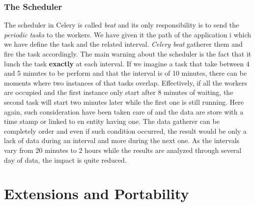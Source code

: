 \subsubsection*{The Scheduler}
The scheduler in Celery is called \emph{beat} and its only responsibility is to send the \emph{periodic tasks} to the workers. We have given it the path of the application i which we have define the task and the related interval. \emph{Celery beat} gatherer them and fire the task accordingly. The main warning about the scheduler is the fact that it lunch the task \textbf{exactly} at each interval. If we imagine a task that take between 4 and 5 minutes to be perform and that the interval is of 10 minutes, there can be moments where two instances of that tasks overlap. Effectively, if all the workers are occupied and the first instance only start after 8 minutes of waiting, the second task will start two minutes later while the first one is still running. Here again, such consideration have been taken care of and the data are store with a time stamp or linked to en entity having one. The data gatherer can be completely order and even if such condition occurred, the result would be only a lack of data during an interval and more during the next one. As the intervals vary from 20 minutes to 2 hours while the results are analyzed through several day of data, the impact is quite reduced. 

\section{Extensions and Portability}
